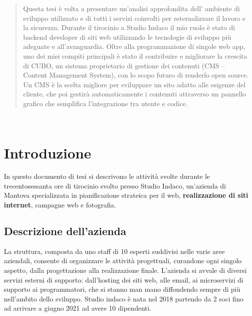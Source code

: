 \documentclass[12pt,a4paper]{article}
\begin{document}
\begin{abstract}
\normalsize
Questa tesi è volta a presentare un’analisi approfondita dell' ambiente di sviluppo utilizzato e di tutti i servizi coinvolti per esternalizzare il lavoro e la sicurezza.
Durante il tirocinio a Studio Indaco il mio ruolo è stato di backend developer di siti web utilizzando le tecnologie di sviluppo più adeguate e all’avanguardia.
Oltre alla programmazione di singole web app, uno dei miei compiti principali è stato il contribuire e migliorare la crescita di CUBO, un sistema proprietario di gestione dei contenuti (CMS – Content Management System), con lo scopo futuro di renderlo open source. Un CMS è la scelta migliore per sviluppare un sito adatto alle esigenze del cliente, che poi gestirà automaticamente i contenuti attraverso un pannello grafico che semplifica l'integrazione tra utente e codice.

\end{abstract}
\clearpage
\tableofcontents{}
\clearpage

\newpage
\
\newpage

\section{Introduzione}
In questo documento di tesi si descrivono le attività svolte durante le trecentosessanta ore di tirocinio svolto presso Studio Indaco, un'azienda di Mantova specializzata in pianificazione strateica per il web, \textbf{realizzazione di siti internet}, campagne web e fotografia.
\subsection{Descrizione dell'azienda}
La struttura, composta da uno staff di 10 esperti suddivisi nelle varie aree aziendali, consente di organizzare le attività progettuali, curandone ogni singolo aspetto, dalla progettazione alla realizzazione finale.
L’azienda si avvale di diversi servizi esterni di supporto: dall’hosting dei siti web, alle email, ai microservizi di supporto ai programmatori, che si stanno man mano diffondendo sempre di più nell’ambito dello sviluppo.
Studio indaco è nata nel 2018 partendo da 2 soci fino ad arrivare a giugno 2021 ad avere 10 dipendenti.
\end{document}
